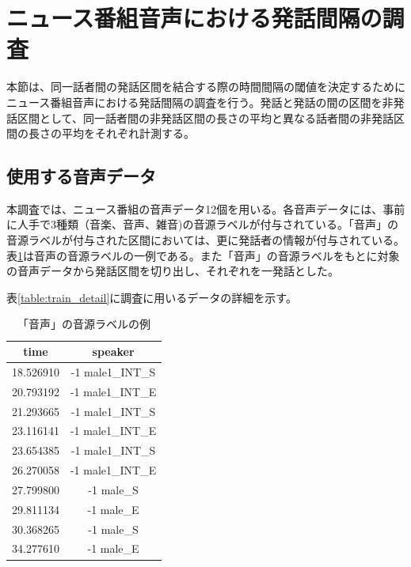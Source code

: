 \section{ニュース番組音声における発話間隔の調査}
\label{section:research_news}
本節は、同一話者間の発話区間を結合する際の時間間隔の閾値を決定するためにニュース番組音声における発話間隔の調査を行う。発話と発話の間の区間を非発話区間として、同一話者間の非発話区間の長さの平均と異なる話者間の非発話区間の長さの平均をそれぞれ計測する。

\subsection{使用する音声データ}
\label{section:detail_train_news}
本調査では、ニュース番組の音声データ12個を用いる。各音声データには、事前に人手で3種類（音楽、音声、雑音)の音源ラベルが付与されている。「音声」の音源ラベルが付与された区間においては、更に発話者の情報が付与されている。表\ref{fig:example_label}は音声の音源ラベルの一例である。また「音声」の音源ラベルをもとに対象の音声データから発話区間を切り出し、それぞれを一発話とした。\par
表\ref{table:train_detail}に調査に用いるデータの詳細を示す。\vspace{0.2in}

\begin{table}[H]
\begin{center}
\caption{「音声」の音源ラベルの例 \label{fig:example_label}}
\begin{tabular}{|c|c|}
\hline
time      & speaker          \\ \hline
18.526910 & -1 male1\_INT\_S \\ \hline
20.793192 & -1 male1\_INT\_E \\ \hline
21.293665 & -1 male1\_INT\_S \\ \hline
23.116141 & -1 male1\_INT\_E \\ \hline
23.654385 & -1 male1\_INT\_S \\ \hline
26.270058 & -1 male1\_INT\_E \\ \hline
27.799800 & -1 male\_S       \\ \hline
29.811134 & -1 male\_E       \\ \hline
30.368265 & -1 male\_S       \\ \hline
34.277610 & -1 male\_E       \\ \hline
\end{tabular}
\end{center}
\end{table}

